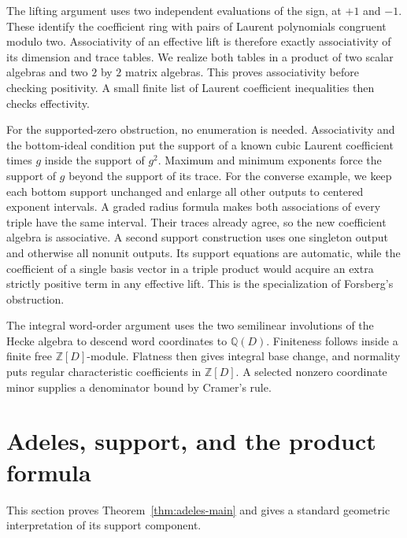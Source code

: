 \documentclass[11pt]{article}
\theoremstyle{definition}\newtheorem{definition}[theorem]{Definition}
\begin{document}
The lifting argument uses two independent evaluations of the sign, at $+1$ and $-1$. These identify the coefficient ring with pairs of Laurent polynomials congruent modulo two. Associativity of an effective lift is therefore exactly associativity of its dimension and trace tables. We realize both tables in a product of two scalar algebras and two $2$ by $2$ matrix algebras. This proves associativity before checking positivity. A small finite list of Laurent coefficient inequalities then checks effectivity.

For the supported-zero obstruction, no enumeration is needed. Associativity and the bottom-ideal condition put the support of a known cubic Laurent coefficient times $g$ inside the support of $g^2$. Maximum and minimum exponents force the support of $g$ beyond the support of its trace. For the converse example, we keep each bottom support unchanged and enlarge all other outputs to centered exponent intervals. A graded radius formula makes both associations of every triple have the same interval. Their traces already agree, so the new coefficient algebra is associative. A second support construction uses one singleton output and otherwise all nonunit outputs. Its support equations are automatic, while the coefficient of a single basis vector in a triple product would acquire an extra strictly positive term in any effective lift. This is the specialization of Forsberg's obstruction.

The integral word-order argument uses the two semilinear involutions of the Hecke algebra to descend word coordinates to $\mathbb Q(D)$. Finiteness follows inside a finite free $\mathbb Z[D]$-module. Flatness then gives integral base change, and normality puts regular characteristic coefficients in $\mathbb Z[D]$. A selected nonzero coordinate minor supplies a denominator bound by Cramer's rule.

\section{Adeles, support, and the product formula}\label{sec:adeles}
This section proves Theorem~\ref{thm:adeles-main} and gives a standard geometric interpretation of its support component.
\end{document}
